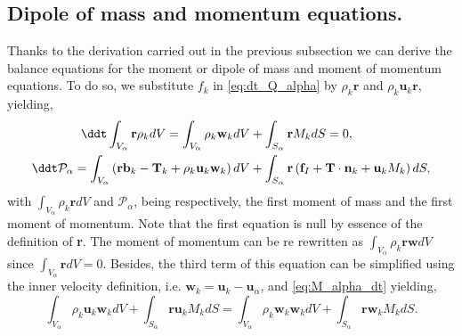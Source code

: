 \subsection{Dipole of mass and momentum equations.}

Thanks to the derivation carried out in the previous subsection we can derive the balance equations for the moment or dipole of mass and moment of momentum equations.
To do so, we substitute $f_k$ in \ref{eq:dt_Q_alpha} by $\rho_k \textbf{r}$ and $\rho_k \textbf{u}_k \textbf{r}$, yielding, 
\begin{align}
    \label{eq:M_alpha_dt}
    \ddt \int_{V_\alpha} \textbf{r} \rho_k dV
    = \int_{V_\alpha} \rho_k  \textbf{w}_k  dV
    &+ \int_{S_\alpha} \textbf{r} M_k  dS = 0,\\
    \label{eq:P_alpha_dt}
    \ddt \mathcal{P}_\alpha
    = \int_{V_\alpha} \left( 
        \textbf{r} \textbf{b}_k 
        - \textbf{T}_k
        + \rho_k \textbf{u}_k  \textbf{w}_k 
    \right) dV
    &+ \int_{S_\alpha} \textbf{r} \left(
        \textbf{f}_I
        + \textbf{T} \cdot \textbf{n}_k
        + \textbf{u}_k M_k
    \right) dS,
\end{align}
with $\int_{V_\alpha} \rho_k \textbf{r} dV$ and  $\mathcal{P}_\alpha$, being respectively, the first moment of mass and the first moment of momentum. 
Note that the first equation is null by essence of the definition of \textbf{r}. 
The moment of momentum can be re rewritten as $\int_{V_\alpha} \rho_k \textbf{rw} dV$ since $\int_{V_\alpha} \textbf{r} dV = 0$. 
Besides, the third term of this equation can be simplified using the inner velocity definition, i.e.  $\textbf{w}_k = \textbf{u}_k - \textbf{u}_\alpha$, and \ref{eq:M_alpha_dt} yielding, 
\begin{equation*}
    \int_{V_\alpha} \rho_k \textbf{u}_k \textbf{w}_k dV 
    + \int_{S_\alpha} \textbf{r} \textbf{u}_k M_k dS
    = 
    \int_{V_\alpha} \rho_k \textbf{w}_k \textbf{w}_k dV 
    + \int_{S_\alpha} \textbf{r} \textbf{w}_k M_k dS. 
\end{equation*}

